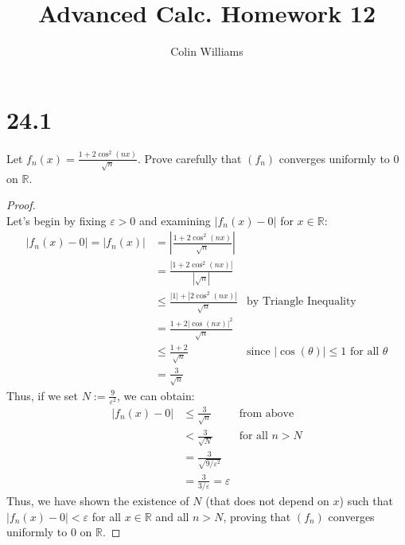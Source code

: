 \documentclass[10pt,a4paper]{article}
\title{Advanced Calc. Homework 12}
\author{Colin Williams}
\theoremstyle{definition}
\begin{document}
\maketitle
\section*{24.1}
Let $\displaystyle f_n(x) = \frac{1 + 2\cos^2(nx)}{\sqrt{n}}$. Prove carefully that $(f_n)$ converges uniformly to 0 on $\mathbb{R}$.

\begin{proof}{$ $}
\\Let's begin by fixing $\varepsilon > 0$ and examining $|f_n(x) - 0|$ for $x \in \mathbb{R}$:
\begin{align*}
|f_n(x) - 0| = |f_n(x)| &= \left|\frac{1 + 2\cos^2(nx)}{\sqrt{n}}\right|\\
&= \frac{|1 + 2\cos^2(nx)|}{|\sqrt{n}|}\\
&\leq \frac{|1| + |2\cos^2(nx)|}{\sqrt{n}} &\text{by Triangle Inequality}\\
&= \frac{1 + 2|\cos(nx)|^2}{\sqrt{n}}\\
&\leq \frac{1 + 2}{\sqrt{n}} &\text{since $|\cos(\theta)| \leq 1$ for all $\theta$}\\
&= \frac{3}{\sqrt{n}}
\end{align*}
Thus, if we set $\displaystyle N := \frac{9}{\varepsilon^2}$, we can obtain:
\begin{align*}
|f_n(x) - 0| &\leq \frac{3}{\sqrt{n}} &\text{from above}\\
&< \frac{3}{\sqrt{N}} &\text{for all $n > N$}\\
&= \frac{3}{\sqrt{9/\varepsilon^2}}\\
&= \frac{3}{3/\varepsilon} = \varepsilon
\end{align*}
Thus, we have shown the existence of $N$ (that does not depend on $x$) such that $|f_n(x) - 0| < \varepsilon$ for all $x \in \mathbb{R}$ and all $n > N$, proving that $(f_n)$ converges uniformly to 0 on $\mathbb{R}$.
\end{proof}
\end{document}
